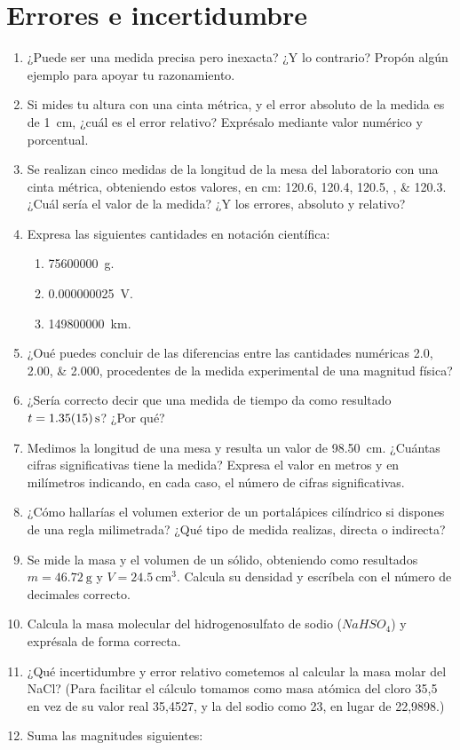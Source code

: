 \documentclass[
]{article}
\begin{document}
\hypertarget{errores-e-incertidumbre}{%
\section{Errores e incertidumbre}\label{errores-e-incertidumbre}}

\begin{enumerate}
\def\labelenumi{\arabic{enumi}.}
\item
  ¿Puede ser una medida precisa pero inexacta? ¿Y lo contrario? Propón
  algún ejemplo para apoyar tu razonamiento.
\item
  Si mides tu altura con una cinta métrica, y el error absoluto de la
  medida es de 1~cm, ¿cuál es el error relativo? Exprésalo mediante
  valor numérico y porcentual.
\item
  Se realizan cinco medidas de la longitud de la mesa del laboratorio
  con una cinta métrica, obteniendo estos valores, en cm: 120.6, 120.4,
  120.5, , \& 120.3. ¿Cuál sería el valor de la medida? ¿Y los errores,
  absoluto y relativo?
\item
  Expresa las siguientes cantidades en notación científica:

  \begin{enumerate}
  \def\labelenumii{\arabic{enumii}.}
  \item
    75600000~g.
  \item
    0.000000025~V.
  \item
    149800000~km.
  \end{enumerate}
\item
  ¿Oué puedes concluir de las diferencias entre las cantidades numéricas
  2.0, 2.00, \& 2.000, procedentes de la medida experimental de una
  magnitud física?
\item
  ¿Sería correcto decir que una medida de tiempo da como resultado
  \(t = \SI{1.35 +- 0.15}{\s}\)? ¿Por qué?
\item
  Medimos la longitud de una mesa y resulta un valor de 98.50~cm.
  ¿Cuántas cifras significativas tiene la medida? Expresa el valor en
  metros y en milímetros indicando, en cada caso, el número de cifras
  significativas.
\item
  ¿Cómo hallarías el volumen exterior de un portalápices cilíndrico si
  dispones de una regla milimetrada? ¿Qué tipo de medida realizas,
  directa o indirecta?
\item
  Se mide la masa y el volumen de un sólido, obteniendo como resultados
  \(m = \SI{46,72}{\g}\) y \(V = \SI{24,5}{\cubic\cm}\). Calcula su
  densidad y escríbela con el número de decimales correcto.
\item
  Calcula la masa molecular del hidrogenosulfato de sodio (\(NaHSO_4\))
  y exprésala de forma correcta.
\item
  ¿Qué incertidumbre y error relativo cometemos al calcular la masa
  molar del NaCl? (Para facilitar el cálculo tomamos como masa atómica
  del cloro 35,5 en vez de su valor real 35,4527, y la del sodio como
  23, en lugar de 22,9898.)
\item
  Suma las magnitudes siguientes:


\end{enumerate}
\end{document}
